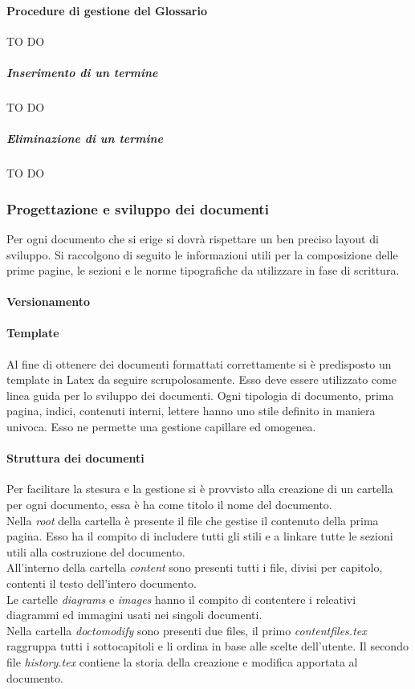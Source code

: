 			\paragraph{Procedure di gestione del Glossario}
				TO DO
				\subparagraph{Inserimento di un termine}
					TO DO
				\subparagraph{Eliminazione di un termine}
					TO DO

		\subsubsection{Progettazione e sviluppo dei documenti}
		Per ogni documento che si erige si dovrà rispettare un ben preciso layout di sviluppo. Si raccolgono di seguito le informazioni utili per la composizione delle prime pagine, le sezioni e le norme tipografiche da utilizzare in fase di scrittura.

			\paragraph{Versionamento}

			\paragraph{Template}
			Al fine di ottenere dei documenti formattati correttamente si è predisposto un template in Latex da seguire scrupolosamente. Esso deve essere utilizzato come linea guida per lo sviluppo dei documenti. Ogni tipologia di documento, prima pagina, indici, contenuti interni, lettere hanno uno stile definito in maniera univoca. Esso ne permette una gestione capillare ed omogenea.\\

			\paragraph{Struttura dei documenti}
			Per facilitare la stesura e la gestione si è provvisto alla creazione di un cartella per ogni documento, essa è ha come titolo il nome del documento.\\
			Nella \emph{root} della cartella è presente il file che gestise il contenuto della prima pagina. Esso ha il compito di includere tutti gli stili e a linkare tutte le sezioni utili alla costruzione del documento.\\
			All'interno della cartella \emph{content} sono presenti tutti i file, divisi per capitolo, contenti il testo dell'intero documento.\\
			Le cartelle \emph{diagrams} e \emph{images} hanno il compito di contentere i releativi diagrammi ed immagini usati nei singoli documenti.\\
			Nella cartella \emph{doc\textunderscore to\textunderscore modify} sono presenti due files, il primo \emph{content\textunderscore files.tex} raggruppa tutti i sottocapitoli e li ordina in base alle scelte dell'utente. Il secondo file \emph{history.tex} contiene la storia della creazione e modifica apportata al documento.

